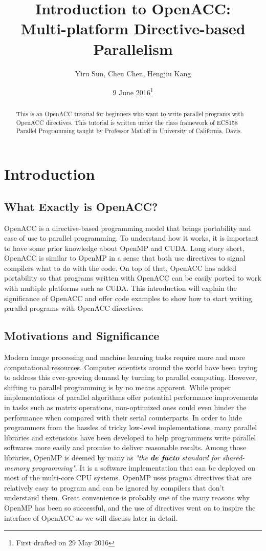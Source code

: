 \documentclass[ebook,10pt,oneside,openany]{memoir}
\title{\textbf{Introduction to OpenACC:} \\
\textbf{Multi-platform Directive-based Parallelism}}
\author{Yiru Sun, Chen Chen, Hengjiu Kang}
\date{9 June 2016\thanks{First drafted on 29 May 2016}}
\begin{document}
\maketitle

\begin{abstract} This is an OpenACC tutorial for beginners who want to write parallel programs with OpenACC directives. This tutorial is written under the class framework of ECS158 Parallel Programming taught by Professor Matloff in University of California, Davis.\end{abstract}

\newpage
\tableofcontents
\listoftables
\lstlistoflistings

\chapter{Introduction}
\section{What Exactly is OpenACC?}
OpenACC is a directive-based programming model that brings portability and ease of use to parallel programming. To understand how it works, it is important to have some prior knowledge about OpenMP and CUDA. Long story short, OpenACC is similar to OpenMP in a sense that both use directives to signal compilers what to do with the code. On top of that, OpenACC has added portability so that programs written with OpenACC can be easily ported to work with multiple platforms such as CUDA. This introduction will explain the significance of OpenACC and offer code examples to show how to start writing parallel programs with OpenACC directives.

\section{Motivations and Significance}
Modern image processing and machine learning tasks require more and more computational resources. Computer scientists around the world have been trying to address this ever-growing demand by turning to parallel computing. However, shifting to parallel programming is by no means apparent. While proper implementations of parallel algorithms offer potential performance improvements in tasks such as matrix operations, non-optimized ones could even hinder the performance when compared with their serial counterparts. In order to hide programmers from the hassles of tricky low-level implementations, many parallel libraries and extensions have been developed to help programmers write parallel softwares more easily and promise to deliver reasonable results. Among those libraries, OpenMP is deemed by many as \textit{"the \textbf{de facto} standard for shared-memory programming"}\cite{matloff}. It is a software implementation that can be deployed on most of the multi-core CPU systems. OpenMP uses pragma directives that are relatively easy to program and can be ignored by compilers that don't understand them. Great convenience is probably one of the many reasons why OpenMP has been so successful, and the use of directives went on to inspire the interface of OpenACC as we will discuss later in detail.
\end{document}
